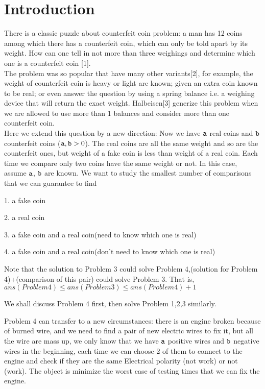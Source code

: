 \section{Introduction}

There is a classic puzzle about counterfeit coin problem: a man has 12 coins among which there has a counterfeit coin, which can only be told apart by its weight. How can one tell in not more than three weighings and determine which one is a counterfeit coin [1].  \\


The problem was so popular that have many other variants[2], for example, the weight of counterfeit coin is heavy or light are known; given an extra coin known to be real; or even answer the question by using a spring balance i.e. a weighing device that will return the exact weight. Halbeisen[3] generize this problem when we are allowed to use more than 1 balances and consider more than one counterfeit coin.  \\



Here we extend this question by a new direction: Now we have $\mathtt{a}$ real coins and $\mathtt{b}$ counterfeit coins ($ \mathtt{a}, \mathtt{b} > 0$). The real coins are all the same weight and so are the counterfeit ones, but weight of a fake coin is less than weight of a real coin. Each time we compare only two coins have the same weight or not. In this case, assume $\mathtt{a}$, $\mathtt{b}$ are known. We want to study the smallest number of comparisons that we can guarantee to find 

1. a fake coin

2. a real coin

3. a fake coin and a real coin(need to know which one is real)

4. a fake coin and a real coin(don't need to know which one is real)

Note that the solution to Problem 3 could solve Problem 4,(solution for Problem 4)+(comparison of this pair) could solve Problem 3. That is, $ans(Problem 4) \leq ans(Problem 3)\leq ans(Problem 4)+1$

We shall discuss Problem 4 first, then solve Problem 1,2,3 similarly.

Problem 4 can transfer to a new circumstances: 
there is an engine broken because of burned wire, and we need to find a pair of new electric wires to fix it, but all the wire are mass up, we only know that we have $\mathtt{a}$ positive wires and $\mathtt{b}$ negative wires in the beginning, each time we can choose 2 of them to connect to the engine and check if they are the same Electrical polarity (not work) or not (work). The object is minimize the worst case of testing times that we can fix the engine.
